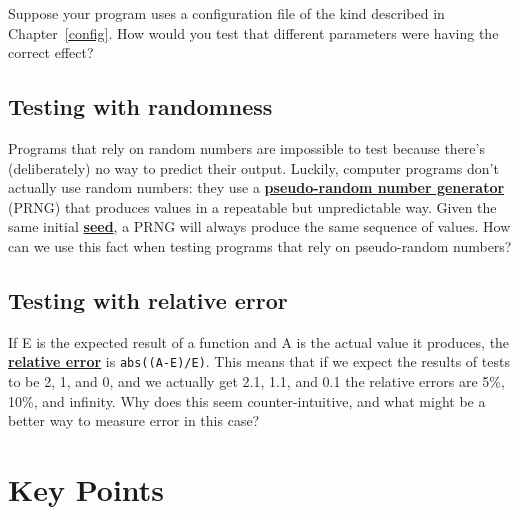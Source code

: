 \documentclass[
]{krantz}
\newcommand{\gref}[2]{\hyperlink{#2}{\textbf{#1}}}
\begin{document}
Suppose your program uses a configuration file of the kind described in Chapter~\ref{config}.
How would you test that different parameters were having the correct effect?

\hypertarget{testing-ex-random}{%
\subsection{Testing with randomness}\label{testing-ex-random}}

Programs that rely on random numbers are impossible to test
because there's (deliberately) no way to predict their output.
Luckily, computer programs don't actually use random numbers:
they use a \gref{pseudo-random number generator}{prng} (PRNG)
that produces values in a repeatable but unpredictable way.
Given the same initial \gref{seed}{seed},
a PRNG will always produce the same sequence of values.
How can we use this fact when testing programs that rely on pseudo-random numbers?

\hypertarget{testing-ex-relative-error}{%
\subsection{Testing with relative error}\label{testing-ex-relative-error}}

If E is the expected result of a function and A is the actual value it produces,
the \gref{relative error}{relative\_error} is \texttt{abs((A-E)/E)}.
This means that if we expect the results of tests to be 2, 1, and 0,
and we actually get 2.1, 1.1, and 0.1
the relative errors are 5\%, 10\%, and infinity.
Why does this seem counter-intuitive,
and what might be a better way to measure error in this case?

\hypertarget{testing-keypoints}{%
\section{Key Points}\label{testing-keypoints}}
\end{document}
